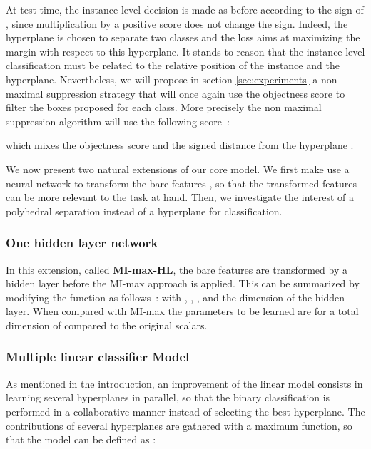 \documentclass[preprint]{elsarticle}
\newcommand\MILS{MI-max}
\newcommand\mimaxaddlayerS{MI-max-HL}
\begin{document}
At test time, the instance level decision is made as before according to the sign of , since multiplication by a positive score does not change the sign. Indeed, the hyperplane  is chosen to separate two classes and the loss  aims at maximizing the margin with respect to this hyperplane. It stands to reason that the instance level classification must be related to the relative position of the instance and the hyperplane. Nevertheless, we will propose in section \ref{sec:experiments} a non maximal suppression strategy that will once again use the objectness score to filter the boxes proposed for each class. More precisely the non maximal suppression algorithm will use the following score~:


which mixes the objectness score  and the signed distance from the hyperplane .


We now present two natural extensions of our core model. We first make use a neural network to transform the bare features , so that the transformed features can be more relevant to the task at hand. Then, we investigate the interest of a polyhedral separation instead of a hyperplane for classification. 

\subsubsection{One hidden layer network}

 In this extension, called \textbf{\mimaxaddlayerS{}}, the bare features  are transformed by a hidden layer before the \MILS{} approach is applied. This can be summarized by modifying the function  as follows~:
   with , , ,  and  the dimension of the hidden layer. When compared with \MILS{} the parameters to be learned are  for a total dimension of  compared to the original  scalars. 



\subsubsection{Multiple linear classifier Model}

As mentioned in the introduction, an improvement of  the linear model consists in learning several hyperplanes in parallel, so that the binary classification is performed in a collaborative manner instead of selecting the best hyperplane. The contributions of several hyperplanes are gathered with a maximum function, so that the model can be defined as : 
\end{document}
